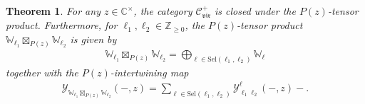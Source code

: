 \documentclass[pdftex]{sigma}
\numberwithin{equation}{section}
\newtheorem{thm}{Theorem}[section]
\newcommand{\bC}{\mathbb{C}}
\newcommand{\bZ}{\mathbb{Z}}
\newcommand{\cC}{\mathcal{C}}
\newcommand{\catVir}{\cC_{\vir}}
\newcommand{\Sel}{\mathrm{Sel}}
\newcommand{\voaint}{\mathcal{Y}}
\newcommand{\virmod}{\mathbb{W}}
\newcommand{\vir}{\mathfrak{vir}}
\begin{document}
\begin{thm}
For any $z\in \bC^{\times}$, the category $\catVir^{+}$ is closed under the $P(z)$-tensor product.
Furthermore, for $\ell_{1},\ell_{2}\in\bZ_{\geq 0}$, the $P(z)$-tensor product $\virmod_{\ell_{1}}\boxtimes_{P(z)}\virmod_{\ell_{2}}$ is given by
\begin{gather}
\label{eq:Pz-tensor_frmods}
 \virmod_{\ell_{1}}\boxtimes_{P(z)}\virmod_{\ell_{2}}=\bigoplus_{\ell\in\Sel (\ell_{1},\ell_{2})}\virmod_{\ell}
\end{gather}
together with the $P(z)$-intertwining map
\begin{gather}
\label{eq:Pz-intmap_frmods}
 \voaint_{\virmod_{\ell_{1}}\boxtimes_{P(z)}\virmod_{\ell_{2}}}(-,z)=\sum_{\ell\in\Sel (\ell_{1},\ell_{2})}\voaint_{\ell_{1} \ell_{2}}^{\ell}(-,z)-.
\end{gather}
\end{thm}
\end{document}
